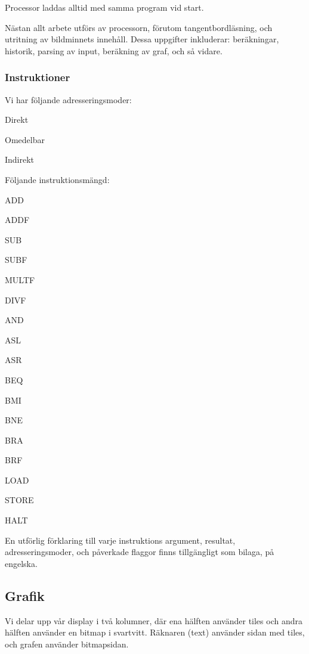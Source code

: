 \documentclass[]{article}
\begin{document}
Processor laddas alltid med samma program vid start. 

Nästan allt arbete utförs av processorn, förutom tangentbordläsning, och utritning av bildminnets innehåll. Dessa uppgifter inkluderar: beräkningar, historik, parsing av input, beräkning av graf, och så vidare.

\newpage

\subsubsection{Instruktioner}
Vi har följande adresseringsmoder:
\begin{itemize*}
\item Direkt
\item Omedelbar
\item Indirekt 
\end{itemize*}
Följande instruktionsmängd:

\begin{multicols}{5}
\begin{itemize*}
\item ADD
\item ADDF
\item SUB
\item SUBF
\item MULTF
\item DIVF
\item AND
\item ASL
\item ASR
\item BEQ
\item BMI
\item BNE
\item BRA
\item BRF
\item LOAD
\item STORE
\item HALT
\end{itemize*}
\end{multicols}

\noindent
En utförlig förklaring till varje instruktions argument, resultat, adresseringsmoder, och påverkade flaggor finns tillgängligt som bilaga, på engelska.

\subsection{Grafik} 
Vi delar upp vår display i två kolumner, där ena hälften använder tiles och andra hälften använder en bitmap i svartvitt. Räknaren (text) använder sidan med tiles, och grafen använder bitmapsidan.
\end{document}
